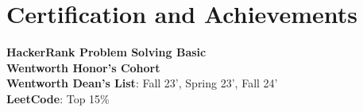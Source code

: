 \documentclass[letterpaper,11pt]{article}
\begin{document}
\section{Certification and Achievements}
\begin{itemize}[leftmargin=0.15in, label={}]
    \small{\item{
     \textbf{HackerRank Problem Solving Basic}\\
     \textbf{Wentworth Honor's Cohort}\\
     \textbf{Wentworth Dean's List}{: Fall 23', Spring 23', Fall 24'} \\
     \textbf{LeetCode}{: Top 15\%} }}
 \end{itemize}
\end{document}
